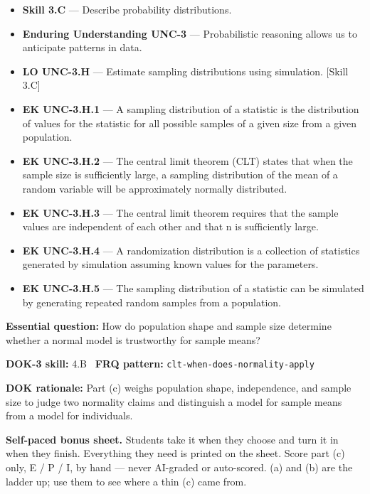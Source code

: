 \documentclass[11pt]{article}
\begin{document}


{\small
\begin{itemize}[leftmargin=1.5em,itemsep=2pt,topsep=2pt]
  \item \textbf{Skill 3.C} --- Describe probability distributions.
  \item \textbf{Enduring Understanding UNC-3} --- Probabilistic reasoning allows us to anticipate patterns in data.
  \item \textbf{LO UNC-3.H} --- Estimate sampling distributions using simulation. [Skill 3.C]
  \item \textbf{EK UNC-3.H.1} --- A sampling distribution of a statistic is the distribution of values for the statistic for all possible samples of a given size from a given population.
  \item \textbf{EK UNC-3.H.2} --- The central limit theorem (CLT) states that when the sample size is sufficiently large, a sampling distribution of the mean of a random variable will be approximately normally distributed.
  \item \textbf{EK UNC-3.H.3} --- The central limit theorem requires that the sample values are independent of each other and that n is sufficiently large.
  \item \textbf{EK UNC-3.H.4} --- A randomization distribution is a collection of statistics generated by simulation assuming known values for the parameters.
  \item \textbf{EK UNC-3.H.5} --- The sampling distribution of a statistic can be simulated by generating repeated random samples from a population.
\end{itemize}
}
\textbf{Essential question:} How do population shape and sample size determine whether a normal model is trustworthy for sample means?\par
\textbf{DOK-3 skill:} 4.B \textperiodcentered\ \textbf{FRQ pattern:} {\small\texttt{clt-\allowbreak{}when-\allowbreak{}does-\allowbreak{}normality-\allowbreak{}apply}}\par
\textbf{DOK rationale:} Part (c) weighs population shape, independence, and sample size to judge two normality claims and distinguish a model for sample means from a model for individuals.\par

\textbf{Self-paced bonus sheet.} Students take it when they choose and turn it in when they finish. Everything they need is printed on the sheet. Score part (c) only, E / P / I, by hand --- never AI-graded or auto-scored. (a) and (b) are the ladder up; use them to see where a thin (c) came from.\par
\end{document}

